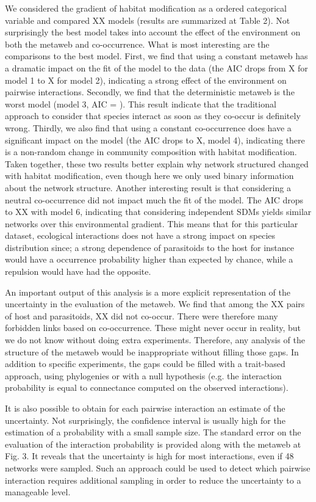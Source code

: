 \documentclass[12pt]{article}
\begin{document}
We considered the gradient of habitat modification as a ordered categorical
variable and compared XX models (results are summarized at Table 2). Not
surprisingly the best model takes into account the effect of the environment on
both the metaweb and co-occurrence. What is most interesting are the comparisons
to the best model. First, we find that using a constant metaweb has a dramatic
impact on the fit of the model to the data (the AIC drops from X for model 1 to
X for model 2), indicating a strong effect of the environment on pairwise
interactions. Secondly, we find that the deterministic metaweb is the worst
model (model 3, AIC = ). This result indicate that the traditional approach to
consider that species interact as soon as they co-occur is definitely wrong.
Thirdly, we also find that using a constant co-occurrence does have a
significant impact on the model (the AIC drops to X, model 4), indicating there
is a non-random change in community composition with habitat modification. Taken
together, these two results better explain why network structured changed with
habitat modification, even though here we only used binary information about the
network structure. Another interesting result is that considering a neutral
co-occurrence did not impact much the fit of the model. The AIC drops to XX
with model 6, indicating that considering independent SDMs yields similar
networks over this environmental gradient. This means that for this particular
dataset, ecological interactions does not have a strong impact on species
distribution since; a strong dependence of parasitoids to the host for instance
would have a occurrence probability higher than expected by chance, while a
repulsion would have had the opposite.

An important output of this analysis is a more explicit representation of the
uncertainty in the evaluation of the metaweb. We find that among the XX pairs of
host and parasitoids, XX did not co-occur. There were therefore many forbidden
links based on co-occurrence. These might never occur in reality, but we do not
know without doing extra experiments. Therefore, any analysis of the structure
of the metaweb would be inappropriate without filling those gaps. In addition to
specific experiments, the gaps could be filled with a trait-based approach,
using phylogenies or with a null hypothesis (e.g. the interaction probability is
equal to connectance computed on the observed interactions).

It is also possible to obtain for each pairwise interaction an estimate of
the uncertainty. Not surprisingly, the confidence interval is usually high
for the estimation of a probability with a small sample size. The standard
error on the evaluation of the interaction probability is provided along
with the metaweb at Fig. 3. It reveals that the uncertainty is high for
most interactions, even if 48 networks were sampled. Such an approach could
be used to detect which pairwise interaction requires additional sampling
in order to reduce the uncertainty to a manageable level.
\end{document}
